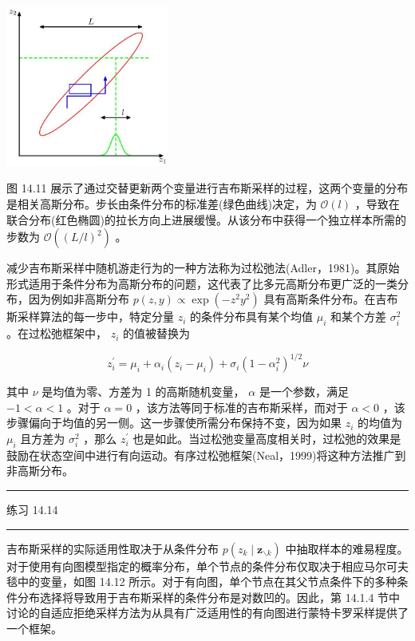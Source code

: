 \documentclass[10pt]{article}
\newcommand{\HRule}{\begin{center}\rule{0.9\linewidth}{0.2mm}\end{center}}
\begin{document}
\begin{center}
\includegraphics[max width=0.4\textwidth]{images/0194e279-9b28-703a-88f4-c3ac21e2010d_468_970_344_579_574_0.jpg}
\end{center}
\hspace*{3em} 

图 14.11 展示了通过交替更新两个变量进行吉布斯采样的过程，这两个变量的分布是相关高斯分布。步长由条件分布的标准差(绿色曲线)决定，为 \(\mathcal{O}\left( l\right)\) ，导致在联合分布(红色椭圆)的拉长方向上进展缓慢。从该分布中获得一个独立样本所需的步数为 \(\mathcal{O}\left( {\left( L/l\right) }^{2}\right)\) 。

减少吉布斯采样中随机游走行为的一种方法称为过松弛法(Adler，1981)。其原始形式适用于条件分布为高斯分布的问题，这代表了比多元高斯分布更广泛的一类分布，因为例如非高斯分布 \(p\left( {z,y}\right)  \propto  \exp \left( {-{z}^{2}{y}^{2}}\right)\) 具有高斯条件分布。在吉布斯采样算法的每一步中，特定分量 \({z}_{i}\) 的条件分布具有某个均值 \({\mu }_{i}\) 和某个方差 \({\sigma }_{i}^{2}\) 。在过松弛框架中， \({z}_{i}\) 的值被替换为

\[
{z}_{i}^{\prime } = {\mu }_{i} + {\alpha }_{i}\left( {{z}_{i} - {\mu }_{i}}\right)  + {\sigma }_{i}{\left( 1 - {\alpha }_{i}^{2}\right) }^{1/2}\nu  \tag{14.46}
\]

其中 \(\nu\) 是均值为零、方差为 1 的高斯随机变量， \(\alpha\) 是一个参数，满足 \(- 1 < \alpha  < 1\) 。对于 \(\alpha  = 0\) ，该方法等同于标准的吉布斯采样，而对于 \(\alpha  < 0\) ，该步骤偏向于均值的另一侧。这一步骤使所需分布保持不变，因为如果 \({z}_{i}\) 的均值为 \({\mu }_{i}\) 且方差为 \({\sigma }_{i}^{2}\) ，那么 \({z}_{i}^{\prime }\) 也是如此。当过松弛变量高度相关时，过松弛的效果是鼓励在状态空间中进行有向运动。有序过松弛框架(Neal，1999)将这种方法推广到非高斯分布。

\HRule

练习 14.14

\HRule

吉布斯采样的实际适用性取决于从条件分布 \(p\left( {{z}_{k} \mid  {\mathbf{z}}_{\smallsetminus k}}\right)\) 中抽取样本的难易程度。对于使用有向图模型指定的概率分布，单个节点的条件分布仅取决于相应马尔可夫毯中的变量，如图 14.12 所示。对于有向图，单个节点在其父节点条件下的多种条件分布选择将导致用于吉布斯采样的条件分布是对数凹的。因此，第 14.1.4 节中讨论的自适应拒绝采样方法为从具有广泛适用性的有向图进行蒙特卡罗采样提供了一个框架。
\end{document}
